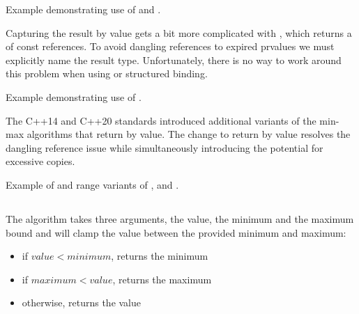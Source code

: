 
\begin{box-note}
\footnotesize Example demonstrating use of  and .
\tcblower
{}
\end{box-note}

Capturing the result by value gets a bit more complicated with , which returns a  of const references. To avoid dangling references to expired prvalues we must explicitly name the result type. Unfortunately, there is no way to work around this problem when using  or structured binding.

\begin{box-note}
\footnotesize Example demonstrating use of .
\tcblower
{}
\end{box-note}

The C++14 and C++20 standards introduced additional variants of the min-max algorithms that return by value. The change to return by value resolves the dangling reference issue while simultaneously introducing the potential for excessive copies.


\begin{box-note}
\footnotesize Example of  and range variants of ,  and .
\tcblower
{}
\end{box-note}

\subsection{\texorpdfstring{}{\texttt{std::clamp}}}

The  algorithm takes three arguments, the value, the minimum and the maximum bound and will clamp the value between the provided minimum and maximum:


\begin{itemize}
    \item if $value < minimum$,  returns the minimum
    \item if $maximum < value$,  returns the maximum
    \item otherwise,  returns the value
\end{itemize}

